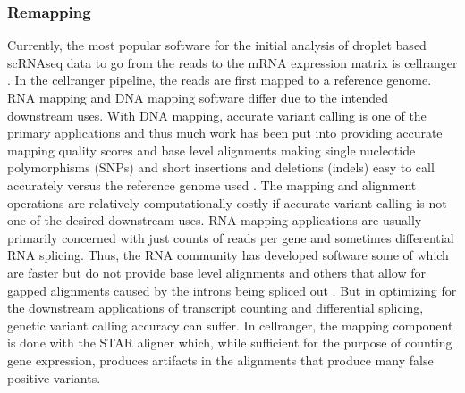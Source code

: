 \subsubsection{Remapping}
\par{
Currently, the most popular software for the initial analysis of droplet based scRNAseq data to go from the reads to the mRNA expression matrix is cellranger \cite{10xsinglecell}. In the cellranger pipeline, the reads are first mapped to a reference genome. RNA mapping and DNA mapping software differ due to the intended downstream uses. With DNA mapping, accurate variant calling is one of the primary applications and thus much work has been put into providing accurate mapping quality scores and base level alignments making single nucleotide polymorphisms (SNPs) and short insertions and deletions (indels) easy to call accurately versus the reference genome used \cite{bwa}\cite{minimap2}\cite{bowtie}\cite{freebayes}\cite{gatk}. The mapping and alignment operations are relatively computationally costly if accurate variant calling is not one of the desired downstream uses. RNA mapping applications are usually primarily concerned with just counts of reads per gene and sometimes differential RNA splicing. Thus, the RNA community has developed software some of which are faster but do not provide base level alignments \cite{kallisto}\cite{salmon} and others that allow for gapped alignments caused by the introns being spliced out \cite{bowtie2}\cite{STAR}\cite{hisat}\cite{tophat}. But in optimizing for the downstream applications of transcript counting and differential splicing, genetic variant calling accuracy can suffer. In cellranger, the mapping component is done with the STAR aligner \cite{STAR} which, while sufficient for the purpose 
of counting gene expression, produces artifacts in the alignments that produce many false positive variants. 
} \\
